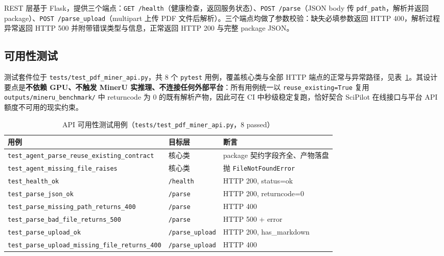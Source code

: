 \documentclass[UTF8,a4paper,11pt]{ctexart}
\begin{document}
REST 层基于 Flask，提供三个端点：\texttt{GET /health}（健康检查，返回服务状态）、\texttt{POST /parse}（JSON body 传 \texttt{pdf\_path}，解析并返回 package）、\texttt{POST /parse\_upload}（multipart 上传 PDF 文件后解析）。三个端点均做了参数校验：缺失必填参数返回 HTTP 400，解析过程异常返回 HTTP 500 并附带错误类型与信息，正常返回 HTTP 200 与完整 package JSON。

\subsection{可用性测试}

测试套件位于 \texttt{tests/test\_pdf\_miner\_api.py}，共 8 个 \texttt{pytest} 用例，覆盖核心类与全部 HTTP 端点的正常与异常路径，见表~\ref{tab:apitests}。其设计要点是\textbf{不依赖 GPU、不触发 MinerU 实推理、不连接任何外部平台}：所有用例统一以 \texttt{reuse\_existing=True} 复用 \texttt{outputs/mineru\_benchmark/} 中 returncode 为 0 的既有解析产物，因此可在 CI 中秒级稳定复跑，恰好契合 SciPilot 在线接口与平台 API 额度不可用的现实约束。

\begin{table}[H]
\centering
\caption{API 可用性测试用例（\texttt{tests/test\_pdf\_miner\_api.py}，8 passed）}
\label{tab:apitests}
\begin{tabular}{p{6.8cm}p{2.4cm}p{3.4cm}}
\toprule
用例 & 目标层 & 断言 \\
\midrule
\texttt{test\_agent\_parse\_reuse\_existing\_contract} & 核心类 & package 契约字段齐全、产物落盘 \\
\texttt{test\_agent\_missing\_file\_raises} & 核心类 & 抛 \texttt{FileNotFoundError} \\
\texttt{test\_health\_ok} & \texttt{/health} & HTTP 200, status=ok \\
\texttt{test\_parse\_json\_ok} & \texttt{/parse} & HTTP 200, returncode=0 \\
\texttt{test\_parse\_missing\_path\_returns\_400} & \texttt{/parse} & HTTP 400 \\
\texttt{test\_parse\_bad\_file\_returns\_500} & \texttt{/parse} & HTTP 500 + error \\
\texttt{test\_parse\_upload\_ok} & \texttt{/parse\_upload} & HTTP 200, has\_markdown \\
\texttt{test\_parse\_upload\_missing\_file\_returns\_400} & \texttt{/parse\_upload} & HTTP 400 \\
\bottomrule
\end{tabular}
\end{table}
\end{document}
